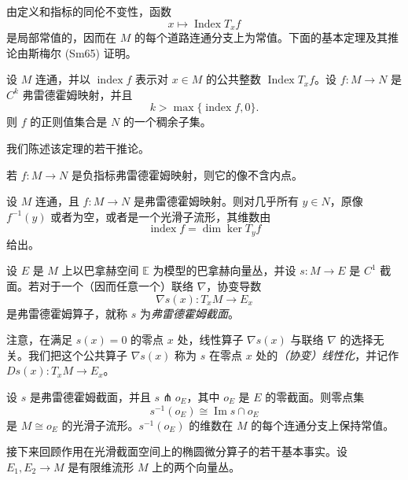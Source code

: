 由定义和指标的同伦不变性，函数
\[
 x\longmapsto\operatorname{Index}T_xf
\]
是局部常值的，因而在 $M$ 的每个道路连通分支上为常值。下面的基本定理及其推论由斯梅尔 (Sm65) 证明。

\begin{theorem}[萨德--斯梅尔定理]\label{thm:sard-smale}
设 $M$ 连通，并以 $\operatorname{index}f$ 表示对 $x\in M$ 的公共整数
$\operatorname{Index}T_xf$。设 $f:M\to N$ 是 $C^k$ 弗雷德霍姆映射，并且
\[
 k>\max\{\operatorname{index}f,0\}.
\]
则 $f$ 的正则值集合是 $N$ 的一个稠余子集。
\end{theorem}

我们陈述该定理的若干推论。

\begin{corollary}\label{cor:negative-index-image-no-interior}
若 $f:M\to N$ 是负指标弗雷德霍姆映射，则它的像不含内点。
\end{corollary}

\begin{corollary}\label{cor:fredholm-preimage-generic-submanifold}
设 $M$ 连通，且 $f:M\to N$ 是弗雷德霍姆映射。则对几乎所有
$y\in N$，原像 $f^{-1}(y)$ 或者为空，或者是一个光滑子流形，其维数由
\[
 \operatorname{index}f=\dim\ker T_yf
\]
给出。
\end{corollary}

\begin{definition}\label{def:fredholm-section}
设 $E$ 是 $M$ 上以巴拿赫空间 $\mathbb E$ 为模型的巴拿赫向量丛，并设
$s:M\to E$ 是 $C^1$ 截面。若对于一个（因而任意一个）联络 $\nabla$，协变导数
\[
 \nabla s(x):T_xM\to E_x
\]
是弗雷德霍姆算子，就称 $s$ 为\emph{弗雷德霍姆截面}。
\end{definition}

注意，在满足 $s(x)=0$ 的零点 $x$ 处，线性算子 $\nabla s(x)$ 与联络 $\nabla$ 的选择无关。我们把这个公共算子 $\nabla s(x)$ 称为 $s$ 在零点 $x$ 处的\emph{（协变）线性化}，并记作
$Ds(x):T_xM\to E_x$。

\begin{proposition}\label{prop:transverse-fredholm-section-zero-set}
设 $s$ 是弗雷德霍姆截面，并且 $s\pitchfork o_E$，其中 $o_E$ 是 $E$ 的零截面。则零点集
\[
 s^{-1}(o_E)\cong\operatorname{Im}s\cap o_E
\]
是 $M\cong o_E$ 的光滑子流形。$s^{-1}(o_E)$ 的维数在 $M$ 的每个连通分支上保持常值。
\end{proposition}

接下来回顾作用在光滑截面空间上的椭圆微分算子的若干基本事实。设
$E_1,E_2\to M$ 是有限维流形 $M$ 上的两个向量丛。

